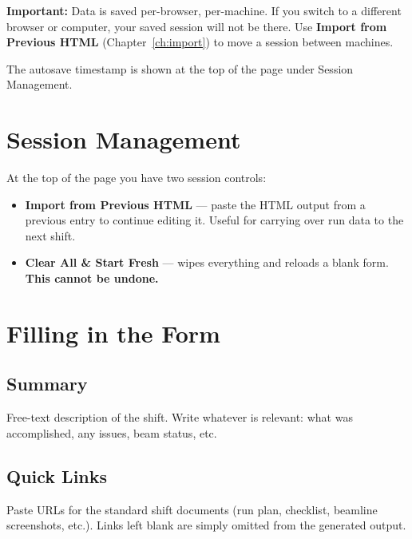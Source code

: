\begin{warningbox}
\textbf{Important:} Data is saved per-browser, per-machine. If you switch to a
different browser or computer, your saved session will not be there. Use
\textbf{Import from Previous HTML} (Chapter~\ref{ch:import}) to move a session
between machines.
\end{warningbox}

The autosave timestamp is shown at the top of the page under Session Management.

\chapter{Session Management}

At the top of the page you have two session controls:

\begin{itemize}
    \item \textbf{Import from Previous HTML} --- paste the HTML output from a
          previous entry to continue editing it. Useful for carrying over run
          data to the next shift.
    \item \textbf{Clear All \& Start Fresh} --- wipes everything and reloads a
          blank form. \textbf{This cannot be undone.}
\end{itemize}

\chapter{Filling in the Form}

\section{Summary}

Free-text description of the shift. Write whatever is relevant: what was
accomplished, any issues, beam status, etc.

\section{Quick Links}

Paste URLs for the standard shift documents (run plan, checklist, beamline
screenshots, etc.). Links left blank are simply omitted from the generated
output.

